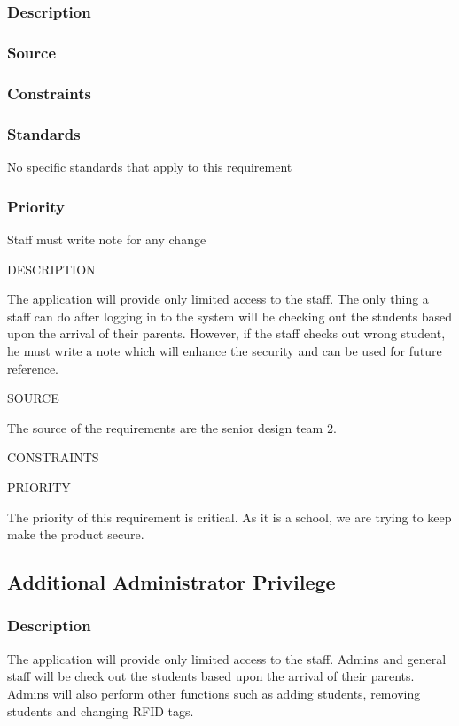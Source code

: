 \subsection{}
\subsubsection{Description}

\subsubsection{Source}

\subsubsection{Constraints}

\subsubsection{Standards}
No specific standards that apply to this requirement
\subsubsection{Priority}

Staff must write note for any change

DESCRIPTION

The application will provide only limited access to the staff. The only thing a staff can do after logging in to the system will be checking out the students based upon the arrival of their parents. However, if the staff checks out wrong student, he must write a note which will enhance the security and can be used for future reference.

SOURCE


The source of the requirements are the senior design team 2.

CONSTRAINTS



PRIORITY

The priority of this requirement is critical. As it is a school, we are trying to keep make the product secure.



\subsection{Additional Administrator Privilege}
\subsubsection{Description}
The application will provide only limited access to the staff. Admins and general 
staff will be check out the students based upon the arrival of their parents. Admins 
will also perform other functions such as adding students, removing students and 
changing RFID tags.
